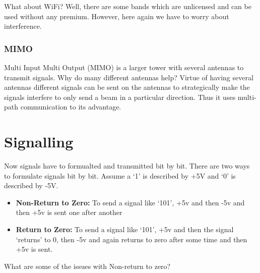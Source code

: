 \documentclass[12pt]{article}
\newcommand{\tbox}[1]{\noindent\fbox{\parbox{\textwidth}{#1}}}
\begin{document}
What about WiFi? Well, there are some bands which are unlicensed and can be used without any premium. However, here 
again we have to worry about interference. 

\noindent\tbox{
    \begin{center}
    \textbf{\Huge Lecture 6}
    \end{center}
}

\subsubsection{MIMO}

Multi Input Multi Output (MIMO) is a larger tower with several antennas to transmit signals. 
Why do many different antennas help? Virtue of having several antennas different signals can be sent on the antennas to strategically make the 
signals interfere to only send a beam in a particular direction. Thus it uses multi-path communication to its advantage. 

\section{Signalling}

Now signals have to formualted and transmitted bit by bit. 
There are two ways to formulate signals bit by bit. Assume a `1' is described by +5V and `0' is described by -5V. 

\begin{itemize}
    \item \textbf{Non-Return to Zero:} To send a signal like `101', +5v and then -5v and then +5v is sent one after another
    \item \textbf{Return to Zero:} To send a signal like `101', +5v and then the signal `returns' to 0, then -5v and again returns to zero after some time and then +5v is sent.
\end{itemize}


What are some of the issues with Non-return to zero?
\end{document}
